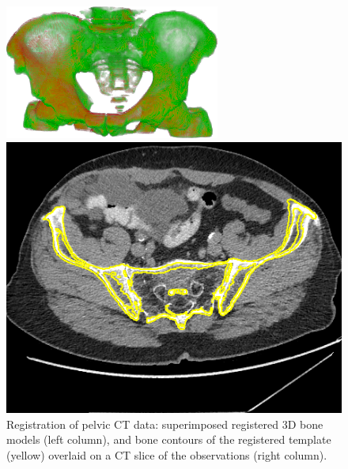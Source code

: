 {\begin{enumerate}
\begin{figure}[]
\begin{minipage}[b]{.42\linewidth}
\centerline{\includegraphics[width=\linewidth]{figures/research/sa_09_10_cut_3d_reg_overlay_gc}}
\vspace{1mm}
\end{minipage}
\hfill
\begin{minipage}[b]{0.42\linewidth}
  \centering
  \centerline{\includegraphics[width=\linewidth]{figures/research/SA_09_10_cut_Reg_Overlay_0056_cut}}
\vspace{1mm}
\end{minipage}
\caption{Registration of pelvic CT data: superimposed registered 3D bone
models (left column), and
bone contours of the registered template (yellow) overlaid on a CT slice of the observations (right column).
}
\label{fig:realct}
\end{figure}


\end{enumerate}}
